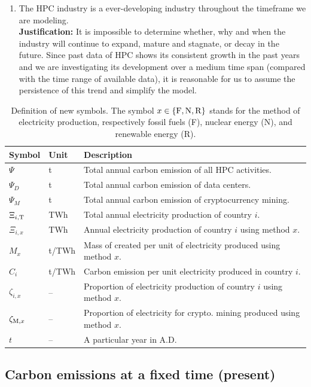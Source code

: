 \documentclass[12pt]{article}
\begin{document}
\begin{enumerate}
	\item The HPC industry is a ever-developing industry throughout the timeframe we are modeling. \\
	\textbf{Justification:} It is impossible to determine whether, why and when the industry will continue to expand, mature and stagnate, or decay in the future. Since past data of HPC shows its consistent growth in the past years and we are investigating its development over a medium time span (compared with the time range of available data), it is reasonable for us to assume the persistence of this trend and simplify the model.
\end{enumerate}

\begin{table}[!t]
	\centering
	\caption{Definition of new symbols. The symbol $x \in \left\{ \rm F, N, R \right\}$ stands for the method of electricity production, respectively fossil fuels (F), nuclear energy (N), and renewable energy (R).}
	\label{table_symbols_q2}
	\begin{tabular}{lll}
		\hline
		\textbf{Symbol} & \textbf{Unit} & \textbf{Description} \\
		\hline
		$\Psi$ & t & Total annual carbon emission of all HPC activities. \\
		$\Psi_D$ & t & Total annual carbon emission of data centers. \\
		$\Psi_M$ & t & Total annual carbon emission of cryptocurrency mining. \\
		$\Xi_{i,\rm T}$ & TWh & Total annual electricity production of country $i$. \\
		$\Xi_{i,x}$ & TWh & Annual electricity production of country $i$ using method $x$. \\
		$M_{x}$ & t/TWh & Mass of \ce{CO2} created per unit of electricity produced using method $x$. \\
		$C_{i}$ & t/TWh & Carbon emission per unit electricity produced in country $i$. \\
		$\zeta_{i,x}$ & -- & Proportion of electricity production of country $i$ using method $x$. \\
		$\zeta_{{\rm M},x}$ & -- & Proportion of electricity for crypto. mining produced using method $x$. \\
		$t$ & -- & A particular year in A.D. \\
		\hline
	\end{tabular}
\end{table}

\subsection{Carbon emissions at a fixed time (present)}
\end{document}
